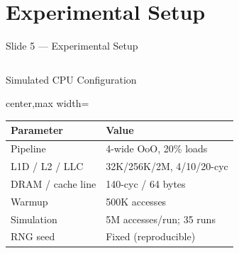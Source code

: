 \documentclass[aspectratio=169,t]{beamer}
\begin{document}
\section{Experimental Setup}
\begin{frame}[shrink=12]{Slide 5 --- Experimental Setup}
\begin{columns}[T,totalwidth=\textwidth]
\begin{block}{Simulated CPU Configuration}
\footnotesize\setlength{\tabcolsep}{3pt}
\centering
\begin{adjustbox}{center,max width=\linewidth}
\begin{tabular}{@{}ll@{}}
\toprule
\textbf{Parameter} & \textbf{Value}\\
\midrule
Pipeline         & 4-wide OoO, 20\% loads\\
L1D / L2 / LLC   & 32K/256K/2M, 4/10/20-cyc\\
DRAM / cache line & 140-cyc / 64 bytes\\
\midrule
Warmup           & 500K accesses\\
Simulation       & 5M accesses/run; 35 runs\\
RNG seed         & Fixed (reproducible)\\
\bottomrule
\end{tabular}
\end{adjustbox}
\end{block}


\end{columns}
\end{frame}
\end{document}
